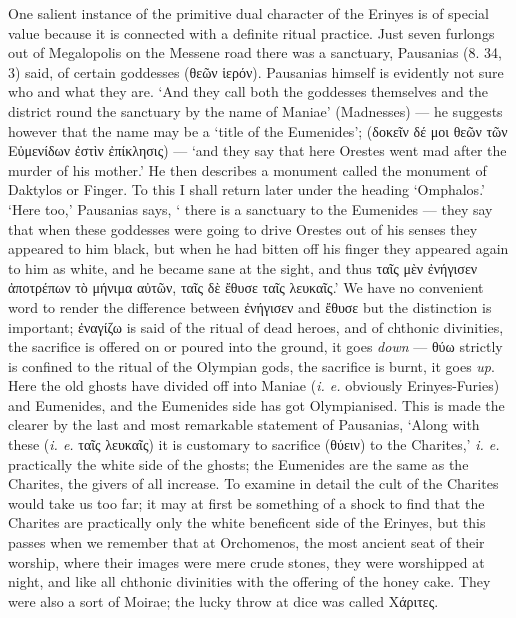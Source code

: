 \documentclass[a4paper, 11pt, oneside, polutonikogreek, english]{article}
\begin{document}
One salient instance of the primitive dual character of the Erinyes is of special value because it is connected with a definite ritual practice. Just seven furlongs out of Megalopolis on the Messene road there was a sanctuary, Pausanias (8. 34, 3) said, of certain goddesses (θεῶν ἱερόν). Pausanias himself is evidently not sure who and what they are. `And they call both the goddesses themselves and the district round the sanctuary by the name of Maniae' (Madnesses) --- he suggests however that the name may be a `title of the Eumenides'; (δοκεῖν δέ μοι θεῶν τῶν Εὐμενίδων ἐστὶν ἐπίκλησις) --- `and they say that here Orestes went mad after the murder of his mother.' He then describes a monument called the monument of Daktylos or Finger. To this I shall return later under the heading `Omphalos.' `Here too,' Pausanias says, ` there is a sanctuary to the Eumenides --- they say that when these goddesses were going to drive Orestes out of his senses they appeared to him black, but when he had bitten off his finger they appeared again to him as white, and he became sane at the sight, and thus ταῖς μὲν ἐνήγισεν ἀποτρέπων τὸ μήνιμα αὐτῶν, ταῖς δὲ ἔθυσε ταῖς λευκαῖς.' We have no convenient word to render the difference between ἐνήγισεν and ἔθυσε but the distinction is important; ἐναγίζω is said of the ritual of dead heroes, and of chthonic divinities, the sacrifice is offered on or poured into the ground, it goes \emph{down} --- θύω strictly is confined to the ritual of the Olympian gods, the sacrifice is burnt, it goes \emph{up}. Here the old ghosts have divided off into Maniae (\emph{i. e.} obviously Erinyes-Furies) and Eumenides, and the Eumenides side has got Olympianised. This is made the clearer by the last and most remarkable statement of Pausanias, `Along with these (\emph{i. e.} ταῖς λευκαῖς) it is customary to sacrifice (θύειν) to the Charites,' \emph{i. e.} practically the white side of the ghosts; the Eumenides are the same as the Charites, the givers of all increase. To examine in detail the cult of the Charites would take us too far; it may at first be something of a shock to find that the Charites are practically only the white beneficent side of the Erinyes, but this passes when we remember that at Orchomenos, the most ancient seat of their worship, where their images were mere crude stones, they were worshipped at night, and like all chthonic divinities with the offering of the honey cake. They were also a sort of Moirae; the lucky throw at dice was called Χάριτες.
\end{document}
